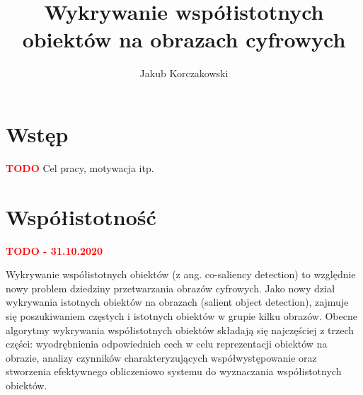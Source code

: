 \documentclass[a4paper,12pt,twoside,openany]{report}
\title{Wykrywanie współistotnych obiektów na obrazach cyfrowych}
\author{Jakub Korczakowski}
\begin{document}
\maketitle

\chapter{Wstęp}
\textcolor{red}{\textbf{TODO}}
Cel pracy, motywacja itp.




	


\chapter{Współistotność}
\textcolor{red}{\textbf{TODO - 31.10.2020}}

Wykrywanie współistotnych obiektów (z ang. co-saliency detection) to względnie nowy problem dziedziny przetwarzania obrazów cyfrowych. Jako nowy dział wykrywania istotnych obiektów na obrazach (salient object detection), zajmuje się poszukiwaniem częstych i istotnych obiektów w grupie kilku obrazów. Obecne algorytmy wykrywania współistotnych obiektów składają się najczęściej z trzech części: wyodrębnienia odpowiednich cech w celu reprezentacji obiektów na obrazie, analizy czynników  charakteryzujących współwystępowanie oraz stworzenia efektywnego obliczeniowo systemu do wyznaczania współistotnych obiektów. 
	 
\end{document}
